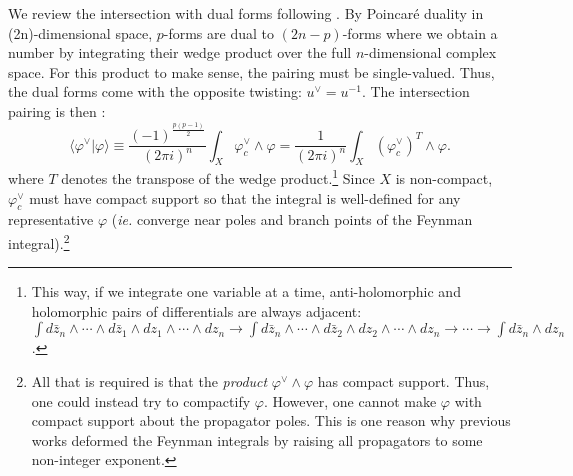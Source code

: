 \documentclass[11pt]{article}
\newcommand{\be}{\begin{equation}}
\newcommand{\ee}{\end{equation}}
\newcommand{\braket}[2]{\big\langle{#1}|{#2}\big\rangle}
\newcommand{\dual}{\vee}
\newcommand{\vphi}{\varphi}
\begin{document}
We review the intersection with dual forms following \cite{Caron-Huot:2021xqj}.
By Poincar\'e duality in (2n)-dimensional space, $p$-forms are dual to $(2n-p)$-forms where we obtain a number by integrating their wedge product over the full $n$-dimensional complex space. For this product to make sense, the pairing must be single-valued. Thus, the dual forms come with the opposite twisting: $u^\vee = u^{-1}$. 
The intersection pairing is then \cite{aomoto2011theory, yoshida2013hypergeometric}:
\be
 	\braket{\vphi^\dual}{\vphi} 
 	\equiv \frac{(-1)^{ \frac{p(p-1)}{2}} }{(2\pi i)^n} \int_X \vphi^\dual_c \wedge \vphi
	= \frac{1}{(2\pi i)^n} \int_X (\vphi^\dual_c)^T \wedge \vphi . 
 \label{pairing}
\ee
where $T$ denotes the transpose of the wedge product.\footnote{This way, if we integrate one variable at a time, anti-holomorphic and holomorphic pairs of differentials are always adjacent: $\int d\bar{z}_n \wedge \cdots \wedge d\bar{z}_1 \wedge dz_1 \wedge \cdots \wedge dz_n \to \int d\bar{z}_n \wedge \cdots \wedge d\bar{z}_2 \wedge dz_2 \wedge \cdots \wedge dz_n \to \cdots \to \int d\bar{z}_n \wedge dz_n$.}
Since $X$ is non-compact, $\vphi^\dual_c$ must have compact support so that the integral is well-defined for any representative
$\vphi$ ({\it ie.} converge near poles and branch points of the Feynman integral).\footnote{All that is required is that the \emph{product} $\vphi^\vee\wedge\vphi$ has compact support. Thus, one could instead try to compactify $\vphi$. However, one cannot make $\vphi$ with compact support about the propagator poles. This is one reason why previous works deformed the Feynman integrals by raising all propagators to some non-integer exponent.}
\end{document}
